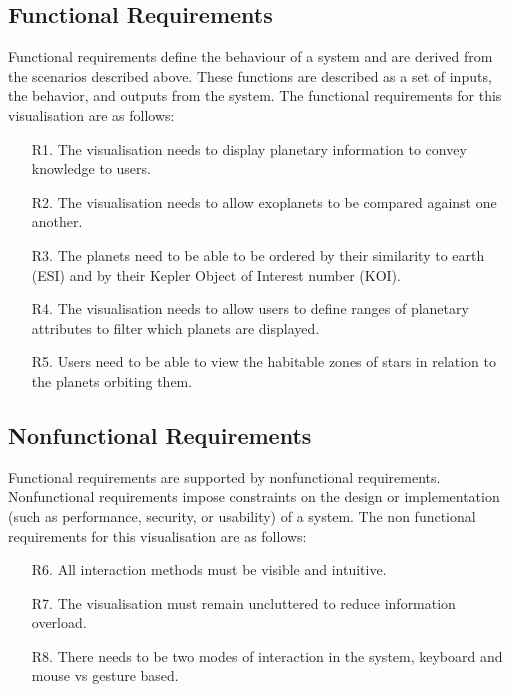 \subsection{Functional Requirements}
Functional requirements define the behaviour of a system and are derived from
the scenarios described above. These functions are
described as a set of inputs, the behavior, and outputs from the system. The
functional requirements for this visualisation are as follows:
\begin{enumerate}

 \item[R1.] The visualisation needs to display planetary information to convey
knowledge to
users.

 \item[R2.] The visualisation needs to allow exoplanets to be compared against
one another.

 \item[R3.] The planets need to be able to be ordered by their similarity to
earth (ESI) and by their Kepler Object of Interest number (KOI).
 
 \item[R4.] The visualisation needs to allow users to define ranges of planetary
attributes to filter which planets are displayed.

 \item[R5.] Users need to be able to view the habitable zones of stars in
relation to the planets orbiting them.

\end{enumerate}

\subsection{Nonfunctional Requirements}
 Functional requirements are supported by nonfunctional requirements. Nonfunctional requirements impose constraints on the design or implementation (such
as performance, security, or usability) of a system. The non functional requirements for this visualisation are as follows:
\begin{enumerate}
 \item[R6.] All interaction methods must be visible and intuitive.

 \item[R7.] The visualisation must remain uncluttered to reduce information
overload.

 \item[R8.]  There needs to be two modes of interaction in the system,
keyboard and mouse vs gesture based.
\end{enumerate}

